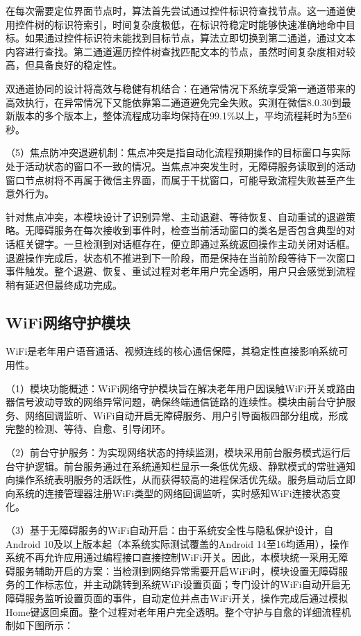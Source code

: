 在每次需要定位界面节点时，算法首先尝试通过控件标识符查找节点。这一通道使用控件树的标识符索引，时间复杂度极低，在标识符稳定时能够快速准确地命中目标。如果通过控件标识符未能找到目标节点，算法立即切换到第二通道，通过文本内容进行查找。第二通道遍历控件树查找匹配文本的节点，虽然时间复杂度相对较高，但具备良好的稳定性。

双通道协同的设计将高效与稳健有机结合：在通常情况下系统享受第一通道带来的高效执行，在异常情况下又能依靠第二通道避免完全失败。实测在微信8.0.30到最新版本的多个版本上，整体流程成功率均保持在99.1\%以上，平均流程耗时为5至6秒。

（5）焦点防冲突退避机制：焦点冲突是指自动化流程预期操作的目标窗口与实际处于活动状态的窗口不一致的情况。当焦点冲突发生时，无障碍服务读取到的活动窗口节点树将不再属于微信主界面，而属于干扰窗口，可能导致流程失败甚至产生意外行为。

针对焦点冲突，本模块设计了识别异常、主动退避、等待恢复、自动重试的退避策略。无障碍服务在每次接收到事件时，检查当前活动窗口的类名是否包含典型的对话框关键字。一旦检测到对话框存在，便立即通过系统返回操作主动关闭对话框。退避操作完成后，状态机不推进到下一阶段，而是保持在当前阶段等待下一次窗口事件触发。整个退避、恢复、重试过程对老年用户完全透明，用户只会感觉到流程稍有延迟但最终成功完成。

\subsection{WiFi网络守护模块}

WiFi是老年用户语音通话、视频连线的核心通信保障，其稳定性直接影响系统可用性。

（1）模块功能概述：WiFi网络守护模块旨在解决老年用户因误触WiFi开关或路由器信号波动导致的网络异常问题，确保终端通信链路的连续性。模块由前台守护服务、网络回调监听、WiFi自动开启无障碍服务、用户引导面板四部分组成，形成完整的检测、等待、自愈、引导闭环。

（2）前台守护服务：为实现网络状态的持续监测，模块采用前台服务模式运行后台守护逻辑。前台服务通过在系统通知栏显示一条低优先级、静默模式的常驻通知向操作系统表明服务的活跃性，从而获得较高的进程保活优先级。服务启动后立即向系统的连接管理器注册WiFi类型的网络回调监听，实时感知WiFi连接状态变化。

（3）基于无障碍服务的WiFi自动开启：由于系统安全性与隐私保护设计，自 Android 10及以上版本起（本系统实际测试覆盖的Android 14至16均适用），操作系统不再允许应用通过编程接口直接控制WiFi开关。因此，本模块统一采用无障碍服务辅助开启的方案：当检测到网络异常需要开启WiFi时，模块设置无障碍服务的工作标志位，并主动跳转到系统WiFi设置页面；专门设计的WiFi自动开启无障碍服务监听设置页面的事件，自动定位并点击WiFi开关，操作完成后通过模拟Home键返回桌面。整个过程对老年用户完全透明。整个守护与自愈的详细流程机制如下图所示：

